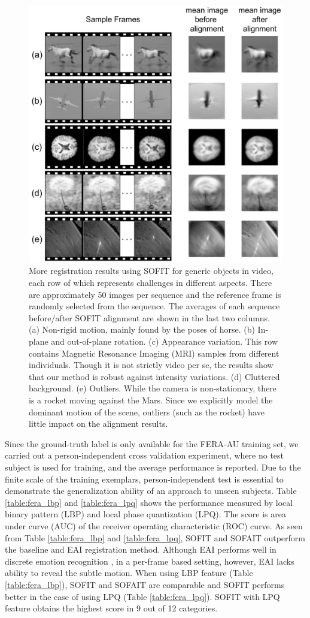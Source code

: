 \documentclass[10pt,journal]{IEEEtran}
\begin{document}
\begin{figure}[htbp]
	\centering
		\includegraphics[width=.65\textwidth]{fig/object_ex.png}
	\caption{\textcolor[rgb]{1,0,0}{More registration results using SOFIT for generic objects in video, each row of which represents challenges in different aspects. There are approximately 50 images per sequence and the reference frame is randomly selected from the sequence. The averages of each sequence before/after SOFIT alignment are shown in the last two columns. (a) Non-rigid motion, mainly found by the poses of horse. (b) In-plane and out-of-plane rotation. (c) Appearance variation. This row contains Magnetic Resonance Imaging (MRI) samples from different individuals. Though it is not strictly video per se, the results show that our method is robust against intensity variations. (d) Cluttered background. (e) Outliers. While the camera is non-stationary, there is a rocket moving against the Mars. Since we explicitly model the dominant motion of the scene, outliers (such as the rocket) have little impact on the alignment results.}}
	\label{fig:object_ex}
\end{figure}

Since the ground-truth label is only available for the FERA-AU training set, we carried out a person-independent cross validation experiment, where no test subject is used for training, and the average performance is reported. Due to the finite scale of the training exemplars, person-independent test is essential to demonstrate the generalization ability of an approach to unseen subjects. Table \ref{table:fera_lbp} and \ref{table:fera_lpq} shows the performance measured by local binary pattern (LBP) and local phase quantization (LPQ). The score is area under curve (AUC) of the receiver operating characteristic (ROC) curve. As seen from Table \ref{table:fera_lbp} and \ref{table:fera_lpq}, SOFIT and SOFAIT outperform the baseline and EAI registration method. Although EAI performs well in discrete emotion recognition \cite{Yang_SMCB12}, in a per-frame based setting, however, EAI lacks ability to reveal the subtle motion. When using LBP feature (Table \ref{table:fera_lbp}), SOFIT and SOFAIT are comparable and SOFIT performs better in the case of using LPQ (Table \ref{table:fera_lpq}). SOFIT with LPQ feature obtains the highest score in 9 out of 12 categories. 
\end{document}
